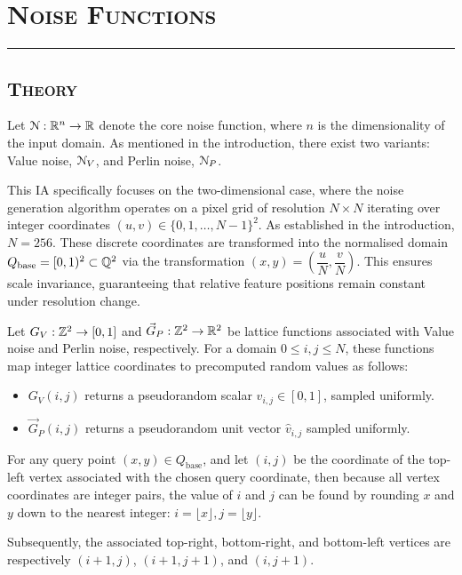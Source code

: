 \section{\textsc{Noise Functions}}
\hrule height 0.5pt
\vspace*{2.5pt}

\subsection{\textsc{Theory}}
\vspace*{-10pt}

Let $\EuScript{N}:\mathbb{R}^n\rightarrow\mathbb{R}$ denote the core noise function, where $n$ is the dimensionality of the
input domain. As mentioned in the introduction, there exist two variants: 
Value noise, $\EuScript{N}_V$, and Perlin noise, $\EuScript{N}_P$.

This IA specifically focuses on the two-dimensional case, where the noise generation algorithm operates on
a pixel grid of resolution $N\times N$ iterating over integer coordinates $(u,v)\in\{0,1,\dots,N-1\}^2$. As
established in the introduction, $N=256$. These discrete coordinates are transformed into the normalised domain 
$Q_\text{base}=[0,1)^2\subset\mathbb{Q}^2$ via the transformation $(x,y)=\left(\dfrac{u}{N},\dfrac{v}{N}\right)$. This 
ensures scale invariance, guaranteeing that relative feature positions remain constant under resolution change. 

Let $G_V:\mathbb{Z}^2\rightarrow[0,1]$ and $\vec{G}_P:\mathbb{Z}^2\rightarrow \mathbb{R}^2$ be lattice functions associated with Value noise and 
Perlin noise, respectively. For a domain $0\le i,j\le N$, these functions map integer lattice coordinates to precomputed
random values as follows:
\begin{itemize}
    \item $G_V(i,j)$ returns a pseudorandom scalar $v_{i,j}\in[0,1]$, sampled uniformly.
    \item $\vec{G}_P(i,j)$ returns a pseudorandom unit vector $\hat{v}_{i,j}$ sampled uniformly. 
\end{itemize}
For any query point $(x,y)\in Q_\text{base}$, and let $(i,j)$ be the coordinate of the top-left vertex associated with the
chosen query coordinate, then because all vertex coordinates are integer pairs, the value of $i$ and $j$ can be found by rounding
$x$ and $y$ down to the nearest integer: $i=\lfloor x\rfloor,j=\lfloor y\rfloor$.
 
Subsequently, the associated top-right, bottom-right, and bottom-left vertices are respectively $(i+1,j)$, $(i+1,j+1)$, and $(i,j+1)$.

